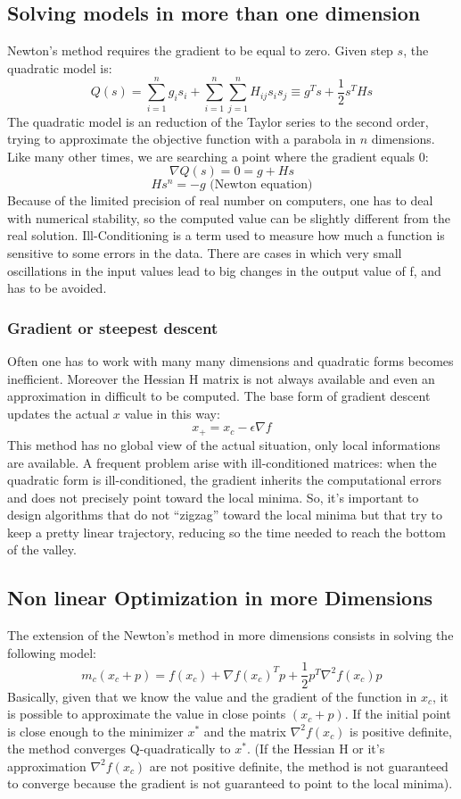 \documentclass[10pt]{article}
\begin{document}
\subsection{Solving models in more than one dimension}
Newton's method requires the gradient to be equal to zero. Given step $s$, the quadratic model is: $$Q(s) = \sum_{i=1}^{n} g_{i} s_{i} + \sum_{i=1}^{n} \sum_{j=1}^{n} H_{ij} s_{i} s_{j} \equiv g^{T} s + \frac{1}{2} s^{T} H s$$ The quadratic model is an reduction of the Taylor series to the second order, trying to approximate the objective function with a parabola in $n$ dimensions. Like many other times, we are searching a point where the gradient equals 0: $$ \nabla Q(s) = 0 = g +Hs $$ $$ Hs^{n} = -g \text{ (Newton equation)} $$ Because of the limited precision of real number on computers, one has to deal with numerical stability, so the computed value can be slightly different from the real solution. Ill-Conditioning is a term used to measure how much a function is sensitive to some errors in the data. There are cases in which very small oscillations in the input values lead to big changes in the output value of f, and has to be avoided.

\subsubsection{Gradient or steepest descent}
Often one has to work with many many dimensions and quadratic forms becomes inefficient. Moreover the Hessian H matrix is not always available and even an approximation in difficult to be computed. The base form of gradient descent updates the actual $x$ value in this way: $$ x_{+} = x_{c} - \epsilon \nabla f $$ This method has no global view of the actual situation, only local informations are available. A frequent problem arise with ill-conditioned matrices: when the quadratic form is ill-conditioned, the gradient inherits the computational errors and does not precisely point toward the local minima. So, it's important to design algorithms that do not ``zigzag'' toward the local minima but that try to keep a pretty linear trajectory, reducing so the time needed to reach the bottom of the valley.

\subsection{Non linear Optimization in more Dimensions}
The extension of the Newton's method in more dimensions consists in solving the following model: $$ m_{c} (x_{c} + p) = f(x_{c}) + \nabla f(x_{c})^T p + \frac{1}{2} p^T \nabla^2 f(x_{c}) p $$ Basically, given that we know the value and the gradient of the function in $x_{c}$, it is possible to approximate the value in close points $(x_{c} + p)$. If the initial point is close enough to the minimizer $x^*$ and the matrix $\nabla^2 f(x_{c})$ is positive definite, the method converges Q-quadratically to $x^*$. (If the Hessian H or it's approximation $\nabla^2 f(x_{c})$ are not positive definite, the method is not guaranteed to converge because the gradient is not guaranteed to point to the local minima).
\end{document}
